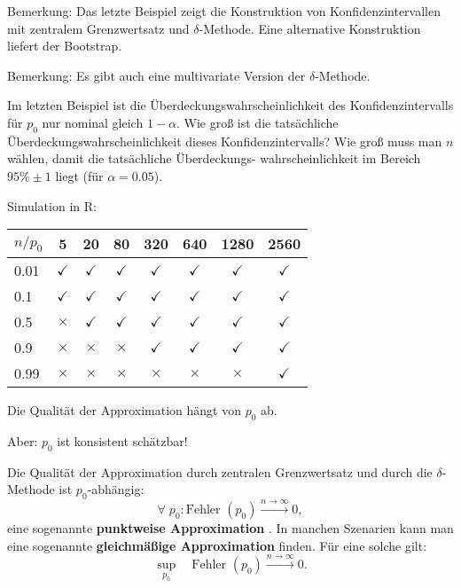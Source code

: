 \documentclass{tstextbook}
\begin{document}
\begin{remark}
	Bemerkung:
	Das letzte Beispiel zeigt die Konstruktion von Konfidenzintervallen mit zentralem Grenzwertsatz und $ \delta $-Methode. Eine alternative Konstruktion liefert der Bootstrap.
\end{remark}

\begin{remark}
	Bemerkung:
	Es gibt auch eine multivariate Version der $ \delta $-Methode.
\end{remark}

Im letzten Beispiel ist die Überdeckungswahrscheinlichkeit des Konfidenzintervalls für $ p_0 $ nur nominal gleich $ 1-\alpha $. Wie groß ist die tatsächliche Überdeckungswahrscheinlichkeit dieses Konfidenzintervalls? Wie groß muss man $ n $ wählen, damit die tatsächliche 
Überdeckungs- wahrscheinlichkeit im Bereich $ 95\%\pm1 $ liegt (für $ \alpha = 0.05 $).


Simulation in R: \\

\begin{center}
\begin{tabular}{l|ccccccc}
	$ n/p_0 $	& 5	& 20	& 80 	& 320	& 640 	& 1280 	& 2560 \\
	\midrule
	0.01		& $\checkmark$	& $\checkmark$	& $\checkmark$	& $\checkmark$	& $\checkmark$	& $\checkmark$	& $\checkmark$ \\
	0.1			& $\checkmark$	& $\checkmark$	& $\checkmark$	& $\checkmark$	& $\checkmark$	& $\checkmark$	& $\checkmark$ \\
	0.5			& $\times$	& $\checkmark$	& $\checkmark$	& $\checkmark$	& $\checkmark$	& $\checkmark$	& $\checkmark$ \\
	0.9			& $\times$	& $\times$	& $\times$	& $\checkmark$	& $\checkmark$	& $\checkmark$	& $\checkmark$ \\
	0.99		& $\times$	& $\times$	& $\times$	& $\times$	& $\times$	& $\times$	& $\checkmark$
\end{tabular}
\end{center}
\vspace{0.5cm}

Die Qualität der Approximation hängt von $ p_0 $ ab. 

Aber: $ p_0 $ ist konsistent schätzbar! 

Die Qualität der Approximation durch zentralen Grenzwertsatz und durch die $ \delta $-Methode ist $ p_0 $-abhängig: 
\[
\forall\; p_0 \colon \text{Fehler }(p_0) \xrightarrow{n\to\infty} 0,
\]
eine sogenannte \textbf{punktweise Approximation} . In manchen Szenarien kann man eine sogenannte \textbf{gleichmäßige Approximation}  finden. Für eine solche gilt:
\[
\underset{p_0}{\sup} \quad \text{Fehler }(p_0) \xrightarrow{n\to\infty} 0.
\]
\end{document}
